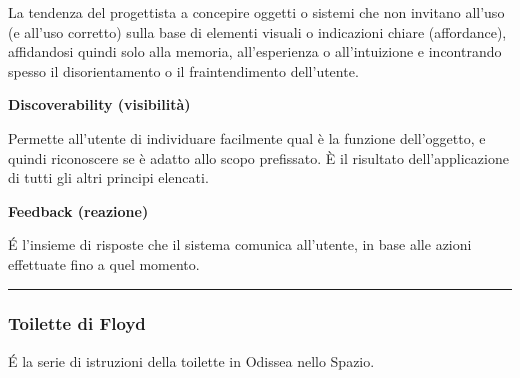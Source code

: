 \documentclass[11pt,a4paper]{book}
\begin{document}
La tendenza del progettista a concepire oggetti o sistemi che non invitano all'uso (e all'uso corretto) sulla base di elementi visuali o indicazioni chiare (affordance), affidandosi quindi solo alla memoria, all'esperienza o all'intuizione e incontrando spesso il disorientamento o il fraintendimento dell'utente.

\begin{center}
	\textbf{Discoverability (visibilità)}
\end{center}

Permette all’utente di individuare facilmente qual è la funzione dell’oggetto, e quindi riconoscere se è adatto allo scopo prefissato. È il risultato dell’applicazione di tutti gli altri principi elencati.

\begin{center}
	\textbf{Feedback (reazione)}
\end{center}

É l’insieme di risposte che il sistema comunica all’utente, in base alle azioni effettuate fino a quel momento.

\noindent\rule{\textwidth}{1pt}

\subsubsection{Toilette di Floyd}\label{par: toilette di Floyd}
É la serie di istruzioni della toilette in Odissea nello Spazio.
\end{document}

